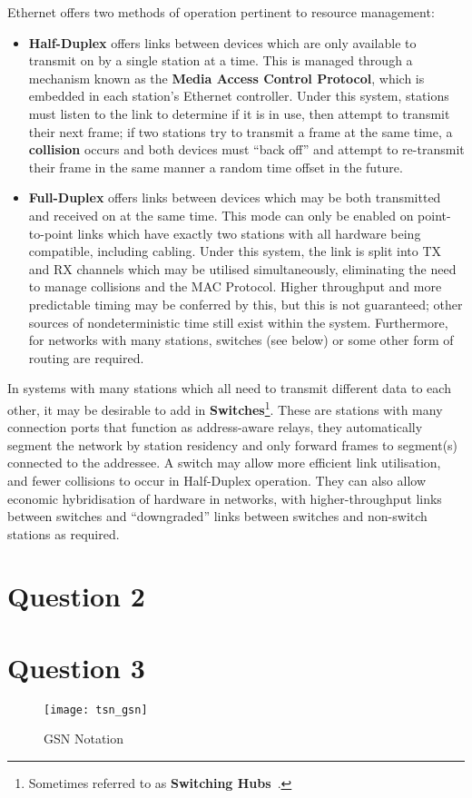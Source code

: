 Ethernet offers two methods of operation pertinent to resource management:

\begin{itemize}
    \item \textbf{Half-Duplex} offers links between devices which are only available to transmit on by a single station at a time.
        This is managed through a mechanism known as the \textbf{Media Access Control Protocol}, which is embedded in each station's Ethernet controller.
        Under this system, stations must listen to the link to determine if it is in use, then attempt to transmit their next frame; if two stations try to transmit a frame at the same time, a \textbf{collision} occurs and both devices must ``back off'' and attempt to re-transmit their frame in the same manner a random time offset in the future.
    \item \textbf{Full-Duplex} offers links between devices which may be both transmitted and received on at the same time.
        This mode can only be enabled on point-to-point links which have exactly two stations with all hardware being compatible, including cabling.
        Under this system, the link is split into TX and RX channels which may be utilised simultaneously, eliminating the need to manage collisions and the MAC Protocol.
        Higher throughput and more predictable timing may be conferred by this, but this is not guaranteed; other sources of nondeterministic time still exist within the system.
        Furthermore, for networks with many stations, switches (see below) or some other form of routing are required.
\end{itemize}

In systems with many stations which all need to transmit different data to each other, it may be desirable to add in \textbf{Switches}\footnote{Sometimes referred to as \textbf{Switching Hubs}~\cite{spurgeonEthernetDefinitiveGuide2000}.}.
These are stations with many connection ports that function as address-aware relays, they automatically segment the network by station residency and only forward frames to segment(s) connected to the addressee.
A switch may allow more efficient link utilisation, and fewer collisions to occur in Half-Duplex operation.
They can also allow economic hybridisation of hardware in networks, with higher-throughput links between switches and ``downgraded'' links between switches and non-switch stations as required.



\section{Question 2}




\section{Question 3}




\begin{figure}[h]
\centering
\texttt{[image: tsn\_gsn]}
\caption{GSN Notation}
\end{figure}
